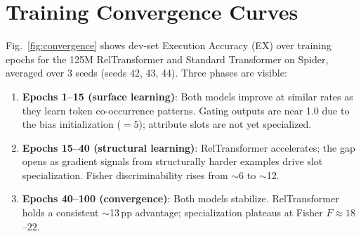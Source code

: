 \documentclass[conference]{IEEEtran}
\begin{document}
\iffalse
\section{Training Convergence Curves}
\label{app:convergence}

Fig.~\ref{fig:convergence} shows dev-set Execution Accuracy (EX) over training epochs for the 125M RelTransformer and Standard Transformer on Spider, averaged over 3 seeds (seeds 42, 43, 44). Three phases are visible:

\begin{enumerate}[noitemsep,topsep=2pt]
  \item \textbf{Epochs 1--15 (surface learning)}: Both models improve at similar rates as they learn token co-occurrence patterns. Gating outputs are near 1.0 due to the bias initialization ($= 5$); attribute slots are not yet specialized.
  \item \textbf{Epochs 15--40 (structural learning)}: RelTransformer accelerates; the gap opens as gradient signals from structurally harder examples drive slot specialization. Fisher discriminability rises from $\sim$6 to $\sim$12.
  \item \textbf{Epochs 40--100 (convergence)}: Both models stabilize. RelTransformer holds a consistent $\sim$13\,pp advantage; specialization plateaus at Fisher $F \approx 18$--$22$.
\end{enumerate}
\end{document}

